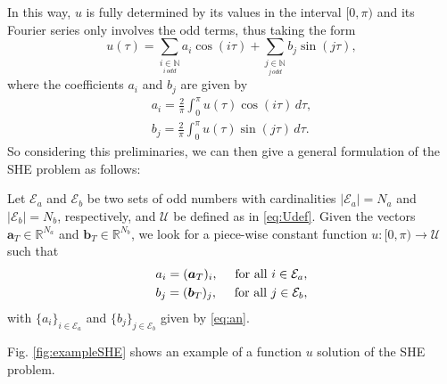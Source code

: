 In this way, $u$ is fully determined by its values in the interval $[0,\pi)$ and its Fourier series only involves the odd terms, thus taking the form
\begin{equation}
	u(\tau ) = \sum_{\underset{i\, odd}{i \in \mathbb{N}}} a_i \cos(i\tau)+ \sum_{\underset{j\, odd}{j \in \mathbb{N}}}  b_j \sin(j \tau), 
\end{equation}
where the coefficients $a_i$ and $b_j$ are given by
\begin{equation} \label{eq:an}
	\begin{aligned}
		a_i = \frac{2}{\pi} \int_0^\pi u(\tau ) \cos(i \tau)\,d\tau, 
		\\
		b_j = \frac{2}{\pi} \int_0^\pi u(\tau)  \sin(j \tau)\,d\tau.
	\end{aligned}
\end{equation}
So considering this preliminaries, we can then give a general formulation of the SHE problem as follows:
\vspace{1em}
\begin{problem}[SHE]\label{pb:SHEp}
Let $\mathcal{E} _a $ and $\mathcal{E} _b $ be two sets of odd numbers with cardinalities $|\mathcal{E}_a| = N_a $ and $ |\mathcal{E} _b| = N_b$, respectively, and $\mathcal{U}$ be defined as in \eqref{eq:Udef}. Given the vectors $\bm{a}_T \in \mathbb{R}^{N_a}$ and $\bm{b}_T \in \mathbb{R}^{N_b} $, we look for a piece-wise constant function $u: [0,\pi)\to\mathcal{U}$ such that 
\begin{gather}
	\notag a_i = (\bm{a}_T)_i, \quad\textrm{ for all } i \in \mathcal{E}_a,
	\\
	\notag b_j = (\bm {b}_T)_j, \quad\textrm{ for all } j \in \mathcal{E}_b,
\end{gather}
with $\{a_i\}_{i\in\mathcal E_a}$ and $\{b_j\}_{j\in\mathcal E_b}$ given by \eqref{eq:an}.
\end{problem} 
 
Fig. \ref{fig:exampleSHE} shows an example of a function $u$ solution of the SHE problem. 

